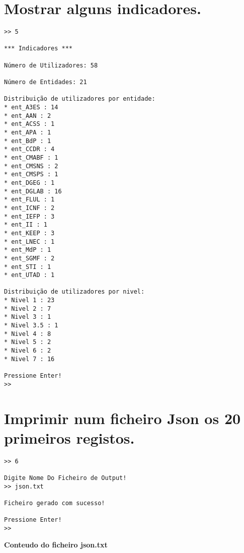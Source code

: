 \documentclass[11pt,a4paper]{report}%
\begin{document}
\section{Mostrar alguns indicadores.}

\begin{verbatim}
>> 5

*** Indicadores ***

Número de Utilizadores: 58

Número de Entidades: 21

Distribuição de utilizadores por entidade:
* ent_A3ES : 14
* ent_AAN : 2
* ent_ACSS : 1
* ent_APA : 1
* ent_BdP : 1
* ent_CCDR : 4
* ent_CMABF : 1
* ent_CMSNS : 2
* ent_CMSPS : 1
* ent_DGEG : 1
* ent_DGLAB : 16
* ent_FLUL : 1
* ent_ICNF : 2
* ent_IEFP : 3
* ent_II : 1
* ent_KEEP : 3
* ent_LNEC : 1
* ent_MdP : 1
* ent_SGMF : 2
* ent_STI : 1
* ent_UTAD : 1

Distribuição de utilizadores por nivel:
* Nivel 1 : 23
* Nivel 2 : 7
* Nivel 3 : 1
* Nivel 3.5 : 1
* Nivel 4 : 8
* Nivel 5 : 2
* Nivel 6 : 2
* Nivel 7 : 16

Pressione Enter!
>> 
\end{verbatim}



\section{Imprimir num ficheiro Json os 20 primeiros registos.}

\begin{verbatim}
>> 6

Digite Nome Do Ficheiro de Output!
>> json.txt

Ficheiro gerado com sucesso!

Pressione Enter!
>> 
\end{verbatim}

\textbf{Conteudo do ficheiro json.txt}
\end{document}
